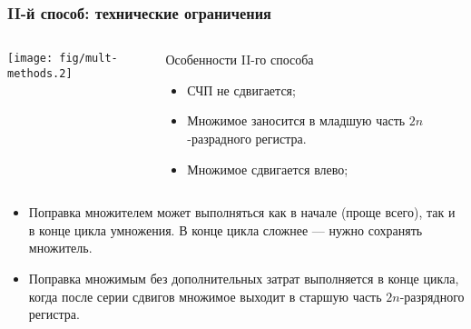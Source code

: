 \begin{frame}
    \frametitle{II-й способ: технические ограничения}
    
    \begin{columns}
            \begin{block}{}
                \texttt{[image: fig/mult-methods.2]}
            \end{block}
            \begin{block}{Особенности II-го способа}
                \begin{itemize}
                    \item СЧП не сдвигается; 
                    \item Множимое заносится в младшую часть $2n$-разрадного регистра.
                    \item Множимое сдвигается влево;
                \end{itemize}
            \end{block}
    \end{columns}
    
    \begin{itemize}
        \item Поправка множителем может выполняться как в начале (проще всего), так и в конце цикла умножения. В конце цикла сложнее --- нужно сохранять множитель.
        \item Поправка множимым без дополнительных затрат выполняется в конце цикла, когда после серии сдвигов множимое выходит в старшую часть $2n$-разрядного регистра.
    \end{itemize}
\end{frame}    


